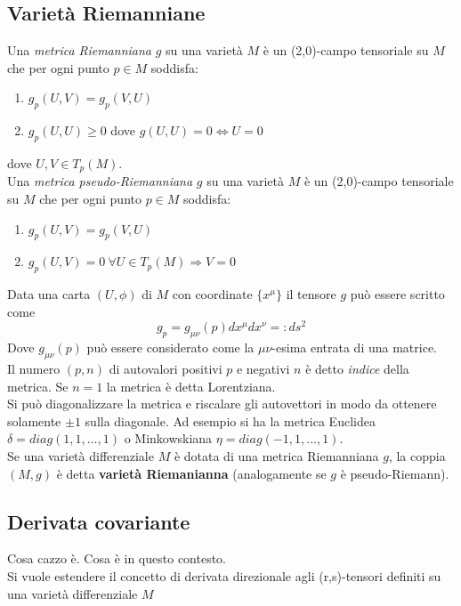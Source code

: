 \subsection{Varietà Riemanniane}
\begin{definition}
   Una \emph{metrica Riemanniana} $g$ su una varietà $M$ è un (2,0)-campo tensoriale
   su $M$ che per ogni punto $p \in M$ soddisfa:
   \begin{enumerate}
      \item $ g_p(U,V) = g_p(V,U) $
      \item $ g_p(U,U) \geq 0 $ dove $ g(U,U) = 0 \iff U = 0$
   \end{enumerate}
   dove $U,V \in T_p(M)$.\\

   Una \emph{metrica pseudo-Riemanniana} $g$ su una varietà $M$ è un
   (2,0)-campo tensoriale su $M$ che per ogni punto $p \in M$ soddisfa:
   \begin{enumerate}
      \item $ g_p(U,V) = g_p(V,U) $
      \item $ g_p(U,V) = 0 \: \forall U \in T_p(M) \Rightarrow V = 0$
   \end{enumerate}
\end{definition}

Data una carta $(U,\phi)$ di $M$ con coordinate $\{x^\mu\}$ il tensore $g$ può
essere scritto come
$$ g_p = g_{\mu\nu}(p) dx^\mu dx^\nu =: ds^2$$
Dove $g_{\mu\nu}(p)$ può essere considerato come la $\mu\nu$-esima entrata di una matrice.\\
Il numero $(p,n)$ di autovalori positivi $p$ e negativi $n$ è detto \emph{indice} della
metrica. Se $n=1$ la metrica è detta Lorentziana.\\
Si può diagonalizzare la metrica e riscalare gli autovettori in modo da ottenere
solamente $\pm 1$ sulla diagonale. Ad esempio si ha la metrica Euclidea
$\delta = diag(1,1,\dots,1)$ o Minkowskiana $\eta = diag(-1,1,...,1)$.\\

Se una varietà differenziale $M$ è dotata di una metrica Riemanniana $g$, la coppia $(M,g)$
è detta \textbf{varietà Riemanianna} (analogamente se $g$ è pseudo-Riemann).\\

\subsection{Derivata covariante}
Cosa cazzo è. Cosa è in questo contesto.\\
Si vuole estendere il concetto di derivata direzionale agli (r,s)-tensori definiti
su una varietà differenziale $M$\\

